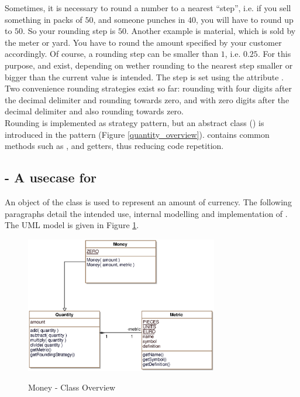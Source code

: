 Sometimes, it is necessary to round a number to a nearest ``step'', i.e. if you sell something in packs of $50$, and someone punches in $40$, you will have to round up to $50$.
So your rounding step is $50$.
Another example is material, which is sold by the meter or yard.
You have to round the amount specified by your customer accordingly.
Of course, a rounding step can be smaller than $1$, i.e. $0.25$.
For this purpose,  and  exist, depending on wether rounding to the nearest step smaller or bigger than the current value is intended.
The step is set using the attribute .
\\

Two convenience rounding strategies exist so far:  rounding with four digits after the decimal delimiter and rounding towards zero, and  with zero digits after the decimal delimiter and also rounding towards zero.
\\

Rounding is implemented as strategy pattern, but an abstract class () is introduced in the pattern (Figure \ref{quantity_overview}).
 contains common methods such as ,  and getters, thus reducing code repetition.
\subsection{ - A usecase for }
An object of the class  is used to represent an amount of currency.
The following paragraphs detail the intended use, internal modelling and implementation of .
The UML model is given in Figure \ref{money_overview}.

\begin{figure}[ht]
	\centering
  \includegraphics[width=0.75\textwidth]{images/Money_Overview.eps}
	\label{money_overview}
	\caption{Money - Class Overview}
\end{figure}


